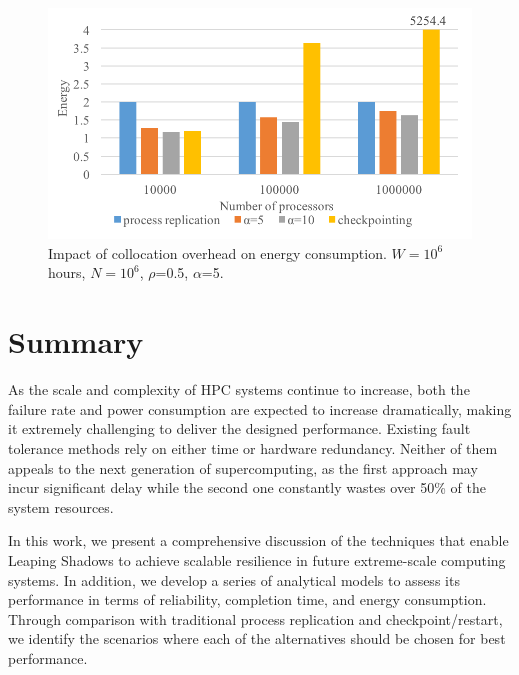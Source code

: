 
\begin{figure}[!h]
	\begin{center}
		\includegraphics[width=0.7\columnwidth]{Figures/tne5}
	\end{center}
	\caption{Impact of collocation overhead on energy consumption. $W=10^6$ hours, $N=10^6$, $\rho$=0.5, $\alpha$=5.}
	\label{fig:comp_vary_fail_speed}
\end{figure}






\section{Summary}

As the scale and complexity of HPC systems continue to increase, both the failure rate and power consumption are expected to increase dramatically, making it extremely challenging to deliver the designed performance. Existing fault tolerance methods rely on either time or hardware redundancy. Neither of them appeals to the next generation of supercomputing, as the first approach may incur significant delay while the second one constantly wastes over 50\% of the system resources.

In this work, we present a comprehensive discussion of the techniques that enable Leaping Shadows to achieve scalable resilience in future extreme-scale computing systems. In addition, we develop a series of analytical models to assess its performance in terms of reliability, completion time, and energy consumption. 
Through comparison with traditional process replication and checkpoint/restart, we identify the scenarios where each of the alternatives should be chosen for best performance.










